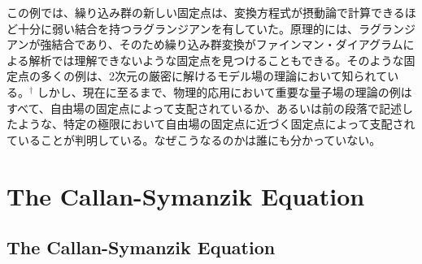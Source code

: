 \documentclass[uplatex,dvipdfmx]{jsarticle}
\begin{document}
この例では、繰り込み群の新しい固定点は、変換方程式が摂動論で計算できるほど十分に弱い結合を持つラグランジアンを有していた。原理的には、ラグランジアンが強結合であり、そのため繰り込み群変換がファインマン・ダイアグラムによる解析では理解できないような固定点を見つけることもできる。そのような固定点の多くの例は、2次元の厳密に解けるモデル場の理論において知られている。$^\dagger$ しかし、現在に至るまで、物理的応用において重要な量子場の理論の例はすべて、自由場の固定点によって支配されているか、あるいは前の段落で記述したような、特定の極限において自由場の固定点に近づく固定点によって支配されていることが判明している。なぜこうなるのかは誰にも分かっていない。
\section{The Callan-Symanzik Equation}
\subsection{The Callan-Symanzik Equation}
\end{document}
